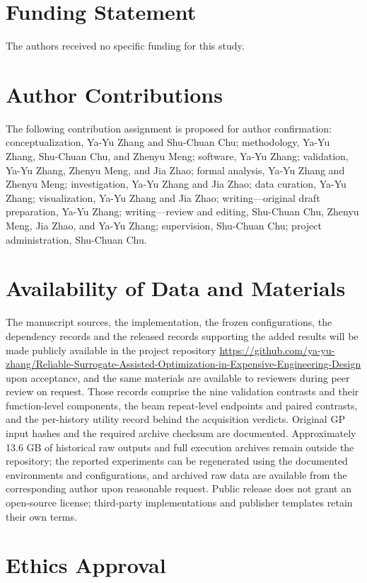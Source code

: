 \documentclass[]{interact}
\begin{document}
\section*{Funding Statement}

The authors received no specific funding for this study.

\section*{Author Contributions}

The following contribution assignment is proposed for author confirmation: conceptualization, Ya-Yu Zhang and Shu-Chuan Chu; methodology, Ya-Yu Zhang, Shu-Chuan Chu, and Zhenyu Meng; software, Ya-Yu Zhang; validation, Ya-Yu Zhang, Zhenyu Meng, and Jia Zhao; formal analysis, Ya-Yu Zhang and Zhenyu Meng; investigation, Ya-Yu Zhang and Jia Zhao; data curation, Ya-Yu Zhang; visualization, Ya-Yu Zhang and Jia Zhao; writing---original draft preparation, Ya-Yu Zhang; writing---review and editing, Shu-Chuan Chu, Zhenyu Meng, Jia Zhao, and Ya-Yu Zhang; supervision, Shu-Chuan Chu; project administration, Shu-Chuan Chu.

\section*{Availability of Data and Materials}

The manuscript sources, the implementation, the frozen configurations, the dependency records and the released records supporting the added results will be made publicly available in the project repository \url{https://github.com/ya-yu-zhang/Reliable-Surrogate-Assisted-Optimization-in-Expensive-Engineering-Design} upon acceptance, and the same materials are available to reviewers during peer review on request. Those records comprise the nine validation contrasts and their function-level components, the beam repeat-level endpoints and paired contrasts, and the per-history utility record behind the acquisition verdicts. Original GP input hashes and the required archive checksum are documented. Approximately 13.6 GB of historical raw outputs and full execution archives remain outside the repository; the reported experiments can be regenerated using the documented environments and configurations, and archived raw data are available from the corresponding author upon reasonable request. Public release does not grant an open-source license; third-party implementations and publisher templates retain their own terms.
\section*{Ethics Approval}
\end{document}
